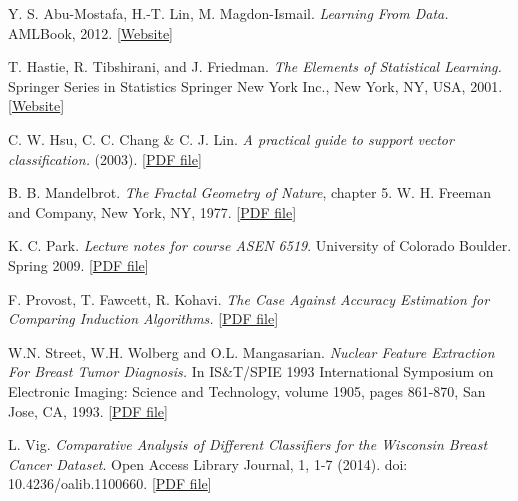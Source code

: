 \documentclass[10pt, a4paper]{article}
\begin{document}
\begin{thebibliography}{}
	
 Y. S. Abu-Mostafa, H.-T. Lin, M. Magdon-Ismail. \emph{Learning From Data.} AMLBook, 2012. [\href{http://amlbook.com/}{Website}]

 T. Hastie, R. Tibshirani, and J. Friedman. \emph{The Elements of Statistical Learning.} Springer Series in Statistics Springer New York Inc., New York, NY, USA, 2001. [\href{https://statweb.stanford.edu/~tibs/ElemStatLearn/}{Website}]

 C. W. Hsu, C. C. Chang \& C. J. Lin. \emph{A practical guide to support vector classification.} (2003). [\href{http://www.datascienceassn.org/sites/default/files/Practical\%20Guide\%20to\%20Support\%20Vector\%20Classification.pdf}{PDF file}]

 B. B. Mandelbrot. \emph{The Fractal Geometry of Nature}, chapter 5. W. H. Freeman and Company, New York, NY, 1977. [\href{http://ordinatous.com/pdf/The_Fractal_Geometry_of_Nature.pdf}{PDF file}]

 K. C. Park. \emph{Lecture notes for course ASEN 6519}. University of Colorado Boulder. Spring 2009. [\href{http://www.colorado.edu/engineering/CAS/courses.d/ASEN6519.d/Lectures.d/Lecture10_11.6519.pdf}{PDF file}]

 F. Provost, T. Fawcett, R. Kohavi. \emph{The Case Against Accuracy Estimation for Comparing Induction Algorithms.} [\href{http://eecs.wsu.edu/~holder/courses/cse6363/spr04/pubs/Provost98.pdf}{PDF file}]

 W.N. Street, W.H. Wolberg and O.L. Mangasarian. \emph{Nuclear Feature Extraction For Breast Tumor Diagnosis.} In IS\&T/SPIE 1993 International Symposium on Electronic Imaging: Science	and Technology, volume 1905, pages 861-870, San Jose, CA, 1993. [\href{http://www.academia.edu/download/40480025/Nuclear_Feature_Extraction_For_Breast_Tu20151129-8677-1d9y618.pdf}{PDF file}]

 L. Vig. \emph{Comparative Analysis of Different Classifiers for the Wisconsin Breast Cancer Dataset}. Open Access Library Journal, 1, 1-7 (2014). doi: 10.4236/oalib.1100660. [\href{http://www.scirp.org/journal/PaperDownload.aspx?paperID=64396}{PDF file}]


\end{thebibliography}
\end{document}
